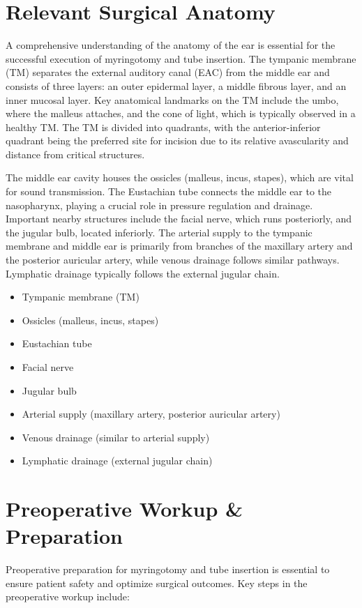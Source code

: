 \section*{Relevant Surgical Anatomy}
A comprehensive understanding of the anatomy of the ear is essential for the successful execution of myringotomy and tube insertion. The tympanic membrane (TM) separates the external auditory canal (EAC) from the middle ear and consists of three layers: an outer epidermal layer, a middle fibrous layer, and an inner mucosal layer. Key anatomical landmarks on the TM include the umbo, where the malleus attaches, and the cone of light, which is typically observed in a healthy TM. The TM is divided into quadrants, with the anterior-inferior quadrant being the preferred site for incision due to its relative avascularity and distance from critical structures.

The middle ear cavity houses the ossicles (malleus, incus, stapes), which are vital for sound transmission. The Eustachian tube connects the middle ear to the nasopharynx, playing a crucial role in pressure regulation and drainage. Important nearby structures include the facial nerve, which runs posteriorly, and the jugular bulb, located inferiorly. The arterial supply to the tympanic membrane and middle ear is primarily from branches of the maxillary artery and the posterior auricular artery, while venous drainage follows similar pathways. Lymphatic drainage typically follows the external jugular chain.

\begin{itemize}
  \item Tympanic membrane (TM)
  \item Ossicles (malleus, incus, stapes)
  \item Eustachian tube
  \item Facial nerve
  \item Jugular bulb
  \item Arterial supply (maxillary artery, posterior auricular artery)
  \item Venous drainage (similar to arterial supply)
  \item Lymphatic drainage (external jugular chain)
\end{itemize}

\section*{Preoperative Workup \& Preparation}
Preoperative preparation for myringotomy and tube insertion is essential to ensure patient safety and optimize surgical outcomes. Key steps in the preoperative workup include:

